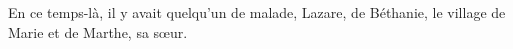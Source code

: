 En ce temps-là, il y avait quelqu’un de malade,
	Lazare, de Béthanie, le village de Marie et de Marthe, sa sœur.

